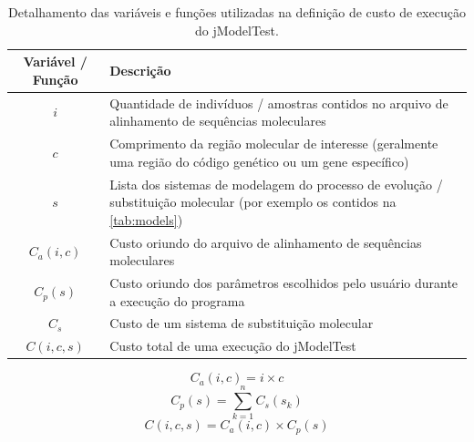 \documentclass[english,brazilian]{UNISINOSmonografia} %
\newcommand\defaultFigureWidth{0.9}
\renewcommand{\arraystretch}{1.3}
\begin{document}
\begin{table}[tb]
	\centering%
	\begin{minipage}{\defaultFigureWidth\textwidth}
		\caption{Detalhamento das variáveis e funções utilizadas na definição de custo de execução do jModelTest.}
		\label{tab:custo-jmodel-elementos}
		\small
		\vspace{1ex}
		\renewcommand\arraystretch{1.4}
		\renewcommand {\tabularxcolumn}[1]{>{\arraybackslash}m{#1}}
		\begin{tabularx}{\textwidth}{cX@{}}
			\toprule
			Variável / Função & Descrição \\ 
			\midrule
			$ i $ & Quantidade de indivíduos / amostras contidos no arquivo de alinhamento de sequências moleculares \\
			$ c $ & Comprimento da região molecular de interesse (geralmente uma região do código genético ou um gene específico) \\
			$ s $ & Lista dos sistemas de modelagem do processo de evolução / substituição molecular (por exemplo os contidos na \autoref{tab:models}) \\
			$ C_a(i,c) $ & Custo oriundo do arquivo de alinhamento de sequências moleculares \\
			$ C_p(s) $ & Custo oriundo dos parâmetros escolhidos pelo usuário durante a execução do programa \\
			$ C_s $ & Custo de um sistema de substituição molecular \\
			$ C(i,c,s) $ & Custo total de uma execução do jModelTest \\
			\bottomrule	
		\end{tabularx}
	\end{minipage}
\end{table}


\begin{equation}
\label{eq:custo-jmodel-arquivo}
C_a(i,c) = i \times c
\end{equation}
\begin{equation}
\label{eq:custo-jmodel-params}
C_p(s) = \sum_{k=1}^{n} C_s(s_k)
\end{equation}
\begin{equation}
\label{eq:custo-jmodel-bestfit}
C(i,c,s) = C_a(i,c) \times C_p(s)
\end{equation}
\end{document}
